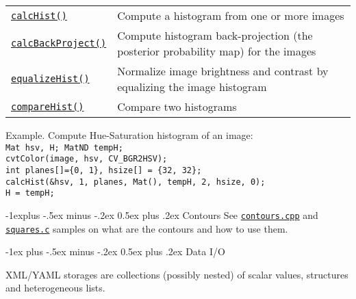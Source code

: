 \documentclass[10pt,landscape]{article}
\makeatletter
\renewcommand{\section}{\@startsection{section}{1}{0mm}%
                                {-1ex plus -.5ex minus -.2ex}%
                                {0.5ex plus .2ex}%
                                {\normalfont\large\bfseries}}
\renewcommand{\subsection}{\@startsection{subsection}{2}{0mm}%
                                {-1explus -.5ex minus -.2ex}%
                                {0.5ex plus .2ex}%
                                {\normalfont\normalsize\bfseries}}
\makeatother
\begin{document}
\begin{multicols}{3}
\begin{tabular}{@{}p{\the\MyLen}%
                @{}p{\linewidth-\the\MyLen}@{}}

\texttt{\href{http://opencv.willowgarage.com/documentation/cpp/histograms.html\#calchist}{calcHist()}} & Compute a histogram from one or more images \\

\texttt{\href{http://opencv.willowgarage.com/documentation/cpp/histograms.html\#calcbackproject}{calcBackProject()}} & Compute histogram back-projection (the posterior probability map) for the images \\

\texttt{\href{http://opencv.willowgarage.com/documentation/cpp/histograms.html\#equalizehist}{equalizeHist()}} & Normalize image brightness and contrast by equalizing the image histogram\\

\texttt{\href{http://opencv.willowgarage.com/documentation/cpp/histograms.html\#comparehist}{compareHist()}} & Compare two histograms\\

\end{tabular}

\begin{tabbing}
Example. Compute Hue-Saturation histogram of an image:\\
\texttt{Mat hsv, H; MatND tempH;}\\
\texttt{cvtColor(image, hsv, CV\_BGR2HSV);}\\
\texttt{int planes[]=\{0, 1\}, hsize[] = \{32, 32\};}\\
\texttt{calcHist(\&hsv, 1, planes, Mat(), tempH, 2, hsize, 0);}\\
\texttt{H = tempH;}
\end{tabbing}

\subsection{Contours}
See \texttt{\href{https://code.ros.org/svn/opencv/trunk/opencv/samples/cpp/contours.cpp}{contours.cpp}} and \texttt{\href{https://code.ros.org/svn/opencv/trunk/opencv/samples/c/squares.c}{squares.c}}
samples on what are the contours and how to use them.

\section{Data I/O}

XML/YAML storages are collections (possibly nested) of scalar values, structures and heterogeneous lists.


\end{multicols}
\end{document}
